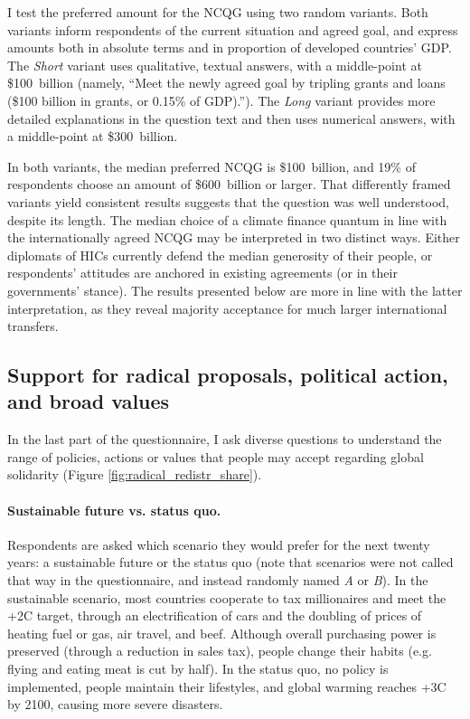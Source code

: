 \documentclass[12pt,english]{article}
\begin{document}
\begin{bibunit}
I test the preferred amount for the NCQG using two random variants. Both variants inform respondents of the current situation and agreed goal, and express amounts both in absolute terms and in proportion of developed countries' GDP. The \textit{Short} variant uses qualitative, textual answers, with a middle-point at \$100~billion (namely, ``Meet the newly agreed goal by tripling grants and loans (\$100 billion in grants, or 0.15\% of GDP).''). The \textit{Long} variant provides more detailed explanations in the question text and then uses numerical answers, with a middle-point at \$300~billion. 

In both variants, the median preferred NCQG is \$100~billion, and 19\% of respondents choose an amount of \$600~billion or larger. That differently framed variants yield consistent results suggests that the question was well understood, despite its length. 
The median choice of a climate finance quantum in line with the internationally agreed NCQG may be interpreted in two distinct ways. Either diplomats of HICs currently defend the median generosity 
of their people, or respondents' attitudes are anchored in existing agreements (or in their governments' stance). The results presented below are more in line with the latter interpretation, as they reveal majority acceptance for much larger international transfers.


\subsection{Support for radical proposals, political action, and broad values}\label{subsec:radical}

In the last part of the questionnaire, I ask diverse questions to understand the range of policies, actions or values that people may accept regarding global solidarity (Figure \ref{fig:radical_redistr_share}).

\paragraph{Sustainable future vs. status quo.}

Respondents are asked which scenario they would prefer for the next twenty years: a sustainable future or the status quo (note that scenarios were not called that way in the questionnaire, and instead randomly named \textit{A} or \textit{B}). In the sustainable scenario, most countries cooperate to tax millionaires and meet the +2\textdegree{}C target, through an electrification of cars and the doubling of prices of heating fuel or gas, air travel, and beef. Although overall purchasing power is preserved (through a reduction in sales tax), people change their habits (e.g. flying and eating meat is cut by half). In the status quo, no policy is implemented, people maintain their lifestyles, and global warming reaches +3\textdegree{}C by 2100, causing more severe disasters. 


\end{bibunit}
\end{document}
